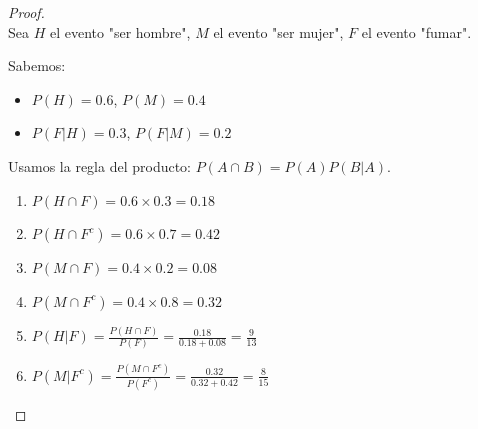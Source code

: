 \documentclass[11pt,letterpaper]{article}
\begin{document}
\begin{proof}\,\\
    Sea \( H \) el evento "ser hombre", \( M \) el evento "ser mujer", \( F \) el evento "fumar".
    
    Sabemos:
    \begin{itemize}
        \item \( P(H) = 0.6 \), \( P(M) = 0.4 \)
        \item \( P(F|H) = 0.3 \), \( P(F|M) = 0.2 \)
    \end{itemize}
    
    Usamos la regla del producto: \( P(A \cap B) = P(A)P(B|A) \).
    
    \begin{enumerate}
        \item \( P(H \cap F) = 0.6 \times 0.3 = 0.18 \)
        \item \( P(H \cap F^c) = 0.6 \times 0.7 = 0.42 \)
        \item \( P(M \cap F) = 0.4 \times 0.2 = 0.08 \)
        \item \( P(M \cap F^c) = 0.4 \times 0.8 = 0.32 \)
        \item \( P(H|F) = \frac{P(H \cap F)}{P(F)} = \frac{0.18}{0.18 + 0.08} = \frac{9}{13} \)
        \item \( P(M|F^c) = \frac{P(M \cap F^c)}{P(F^c)} = \frac{0.32}{0.32 + 0.42} = \frac{8}{15} \)
    \end{enumerate}
\end{proof}\,\\
\end{document}
